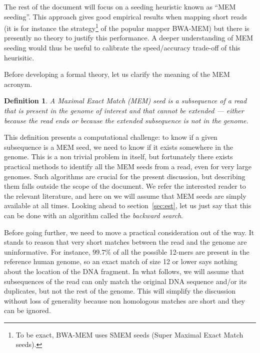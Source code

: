 \documentclass{article}
\newtheorem{definition}{Definition}
\begin{document}
The rest of the document will focus on a seeding heuristic known as ``MEM
seeding''. This approach gives good empirical results when mapping short
reads (it is for instance the strategy\footnote{To be exact, BWA-MEM uses
SMEM seeds (Super Maximal Exact Match seeds).} of the popular mapper
BWA-MEM\cite{li2013aligning}) but there is presently no theory to justify
this performance. A deeper understanding of MEM seeding would thus be
useful to calibrate the speed/accuracy trade-off of this heurisitic.

Before developing a formal theory, let us clarify the meaning of the MEM
acronym.

\begin{definition}
A Maximal Exact Match (MEM) seed is a subsequence of a read that is
present in the genome of interest and that cannot be extended --- either
because the read ends or because the extended subsequence is not in the
genome.
\end{definition}

This definition presents a computational challenge: to know if a given
subsequence is a MEM seed, we need to know if it exists somewhere in the
genome. This is a non trivial problem in itself, but fortunately there
exists practical methods to identify all the MEM seeds from a read, even
for very large genomes\cite{ferragina2000opportunistic,
ferragina2005indexing}. Such algorithms are crucial for the present
discussion, but describing them falls outside the scope of the document.
We refer the interested reader to the relevant
literature\cite{pmid24336412,pmid25399029,pmid23349213,pmid19389736,
li2013aligning}, and here on we will assume that MEM seeds are simply
available at all times. Looking ahead to section~\ref{sec:est}, let
us just say that this can be done with an algorithm called the
\emph{backward search}\cite{ferragina2000opportunistic}.

Before going further, we need to move a practical consideration out of the
way. It stands to reason that very short matches between the read and the
genome are uninformative. For instance, $99.7\%$ of all the possible
12-mers are present in the reference human genome, so an exact match of
size 12 or lower says nothing about the location of the DNA fragment.
In what follows, we will assume that subsequences of the read can only
match the original DNA sequence and/or its duplicates, but not the rest of
the genome. This will simplify the discussion without loss of generality
because non homologous matches are short and they can be ignored.
\end{document}
